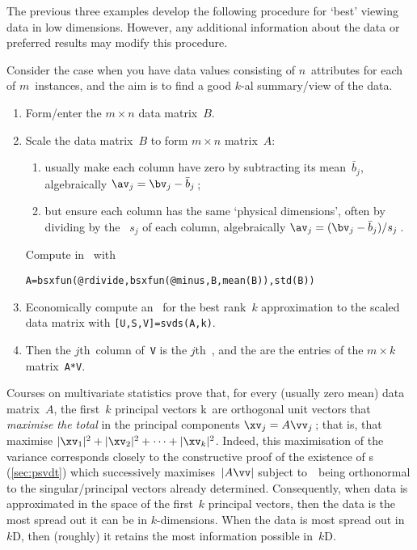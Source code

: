 The previous three examples develop the following procedure for `best' viewing data in low dimensions.
However, any additional information about the data or preferred results may modify this procedure. 


\begin{procedure} \label{pro:pca}
Consider the case when you have data values consisting of \(n\)~attributes for each of \(m\)~instances, and the aim is to find a good \(k\)-al summary\slash view of the data. 
\begin{enumerate}
\item Form\slash enter the \(m\times n\) data matrix~\(B\).
\item {}Scale the data matrix~\(B\) to form \(m\times n\) matrix~\(A\):
\begin{enumerate}
\item usually make each column have zero  by subtracting its mean~\(\bar b_j\), algebraically \(\av_j=\bv_j-\bar b_j\)\,;
\item but ensure each column has the same `physical dimensions', often by dividing by the ~\(s_j\) of each column, algebraically \(\av_j=(\bv_j-\bar b_j)/s_j\)\,.
\end{enumerate}
Compute in \script\ with
{\small
\begin{verbatim}
A=bsxfun(@rdivide,bsxfun(@minus,B,mean(B)),std(B))
\end{verbatim}
}

\item  Economically compute an \svd\ for the best rank~\(k\) approximation to the scaled data matrix with \verb|[U,S,V]=svds(A,k)|.
\item Then the \(j\)th~column of~\verb|V| is the \(j\)th~, and the  are the entries of the \(m\times k\) matrix~\verb|A*V|.
\end{enumerate}
\end{procedure}




Courses on multivariate statistics prove that, for every (usually zero mean) data matrix~\(A\), the first~\(k\) principal vectors \hlist\vv k\ are orthogonal unit vectors that \emph{maximise the total } in the principal components \(\xv_j=A\vv_j\)\,; that is, that maximise \(|\xv_1|^2+|\xv_2|^2+\cdots+|\xv_k|^2\).
Indeed, this maximisation of the variance corresponds closely to the constructive proof of the existence of \svd{}s (\autoref{sec:psvdt}) which successively maximises~\(|A\vv|\) subject to~\vv\ being orthonormal to the singular\slash principal vectors already determined.
Consequently, when data is approximated in the space of the first~\(k\) principal vectors, then the data is the most spread out it can be in \(k\)-dimensions.
When the data is most spread out in~\(k\)D, then (roughly) it retains the most information possible in~\(k\)D.


